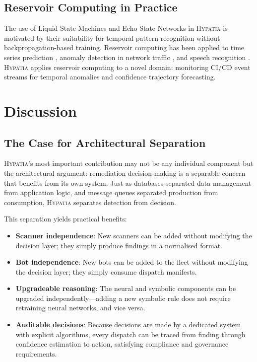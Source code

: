 \documentclass[11pt,a4paper]{article}
\begin{document}
\subsection{Reservoir Computing in Practice}

The use of Liquid State Machines \citep{maass2002} and Echo State Networks \citep{jaeger2001} in \textsc{Hypatia} is motivated by their suitability for temporal pattern recognition without backpropagation-based training. Reservoir computing has been applied to time series prediction \citep{lukovsevivcius2009}, anomaly detection in network traffic \citep{bush2005}, and speech recognition \citep{verstraeten2006}. \textsc{Hypatia} applies reservoir computing to a novel domain: monitoring CI/CD event streams for temporal anomalies and confidence trajectory forecasting.


\section{Discussion}
\label{sec:discussion}

\subsection{The Case for Architectural Separation}

\textsc{Hypatia}'s most important contribution may not be any individual component but the architectural argument: remediation decision-making is a separable concern that benefits from its own system. Just as databases separated data management from application logic, and message queues separated production from consumption, \textsc{Hypatia} separates detection from decision.

This separation yields practical benefits:
\begin{itemize}[nosep]
  \item \textbf{Scanner independence}: New scanners can be added without modifying the decision layer; they simply produce findings in a normalised format.
  \item \textbf{Bot independence}: New bots can be added to the fleet without modifying the decision layer; they simply consume dispatch manifests.
  \item \textbf{Upgradeable reasoning}: The neural and symbolic components can be upgraded independently---adding a new symbolic rule does not require retraining neural networks, and vice versa.
  \item \textbf{Auditable decisions}: Because decisions are made by a dedicated system with explicit algorithms, every dispatch can be traced from finding through confidence estimation to action, satisfying compliance and governance requirements.
\end{itemize}
\end{document}
